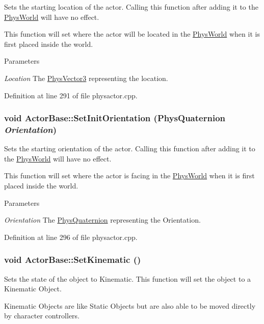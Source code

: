 Sets the starting location of the actor. Calling this function after adding it to the \hyperlink{classPhysWorld}{PhysWorld} will have no effect. \par
 This function will set where the actor will be located in the \hyperlink{classPhysWorld}{PhysWorld} when it is first placed inside the world. 
\begin{DoxyParams}{Parameters}
\item[{\em Location}]The \hyperlink{classPhysVector3}{PhysVector3} representing the location. \end{DoxyParams}


Definition at line 291 of file physactor.cpp.\hypertarget{classActorBase_a72e2d0064c3e4c4d8937f490397a333f}{
\subsubsection[{SetInitOrientation}]{\setlength{\rightskip}{0pt plus 5cm}void ActorBase::SetInitOrientation ({\bf PhysQuaternion} {\em Orientation})}}
\label{dd/d7b/classActorBase_a72e2d0064c3e4c4d8937f490397a333f}


Sets the starting orientation of the actor. Calling this function after adding it to the \hyperlink{classPhysWorld}{PhysWorld} will have no effect. \par
 This function will set where the actor is facing in the \hyperlink{classPhysWorld}{PhysWorld} when it is first placed inside the world. 
\begin{DoxyParams}{Parameters}
\item[{\em Orientation}]The \hyperlink{classPhysQuaternion}{PhysQuaternion} representing the Orientation. \end{DoxyParams}


Definition at line 296 of file physactor.cpp.\hypertarget{classActorBase_a2d5f990e8c6925b7e44e9ec85f379e6a}{
\subsubsection[{SetKinematic}]{\setlength{\rightskip}{0pt plus 5cm}void ActorBase::SetKinematic ()}}
\label{dd/d7b/classActorBase_a2d5f990e8c6925b7e44e9ec85f379e6a}


Sets the state of the object to Kinematic. This function will set the object to a Kinematic Object. \par
 Kinematic Objects are like Static Objects but are also able to be moved directly by character controllers. 

